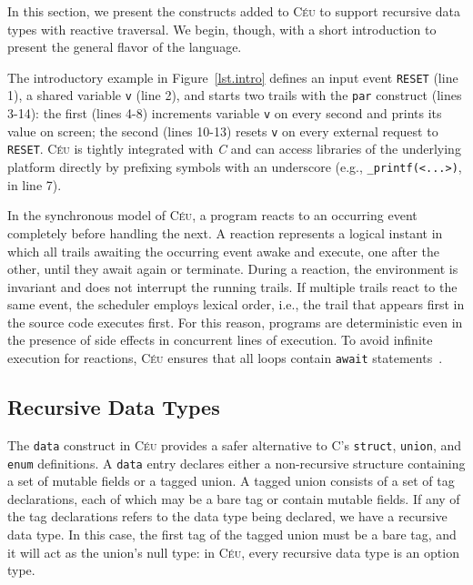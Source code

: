 \documentclass{acm_proc_article-sp}
\newcommand{\CEU}{\textsc{C\'{e}u}\xspace}
\newcommand{\code}[1] {{\small{\texttt{#1}}}}
\begin{document}
In this section, we present the constructs added to \CEU to support recursive
data types with reactive traversal. We begin, though, with a short
introduction to present the general flavor of the language.

The introductory example in Figure~\ref{lst.intro} defines an input event 
\code{RESET} (line 1), a shared variable \code{v} (line 2), and starts two 
trails with the \code{par} construct (lines 3-14): the first (lines 4-8) 
increments variable \code{v} on every second and prints its value on screen; 
the second (lines 10-13) resets \code{v} on every external request to 
\code{RESET}.
\CEU is tightly integrated with \emph{C} and can access libraries of the 
underlying platform directly by prefixing symbols with an underscore (e.g., 
\code{\_printf(<...>)}, in line 7).

In the synchronous model of \CEU, a program reacts to an occurring event 
completely before handling the next.
%
A reaction represents a logical instant in which all trails awaiting the 
occurring event awake and execute, one after the other, until they await again 
or terminate.
%
During a reaction, the environment is invariant and does not interrupt the 
running trails.
If multiple trails react to the same event, the scheduler employs lexical 
order, i.e., the trail that appears first in the source code executes first.
%
For this reason, programs are deterministic even in the presence of side 
effects in concurrent lines of execution.
%
To avoid infinite execution for reactions, \CEU ensures that all loops contain 
\code{await} statements~\cite{ceu.sensys13}.

\subsection{Recursive Data Types}

The \code{data} construct in \CEU provides a safer alternative to C's
\code{struct}, \code{union}, and \code{enum} definitions. A \code{data} entry
declares either a non-recursive structure containing a set of mutable fields
or a tagged union. A tagged union consists of a set of tag declarations, each
of which may be a bare tag or contain mutable fields. If any of the tag
declarations refers to the data type being declared, we have a recursive data
type. In this case, the first tag of the tagged union must be a bare tag, and
it will act as the union's null type: in \CEU, every recursive data type
is an option type.

%
%
%
%
%
\end{document}
